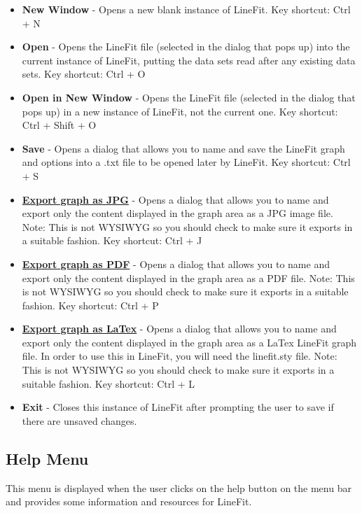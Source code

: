 \documentclass[titlepage,12pt]{article}
\begin{document}
\begin{itemize}
\item \textbf{New Window} - Opens a new blank instance of LineFit. Key shortcut: Ctrl + N
\item \textbf{Open} - Opens the LineFit file (selected in the dialog that pops up) into the current instance of LineFit, putting the data sets read after any existing data sets. Key shortcut: Ctrl + O
\item \textbf{Open in New Window} - Opens the LineFit file (selected in the dialog that pops up) in a new instance of LineFit, not the current one. Key shortcut: Ctrl + Shift + O
\item \textbf{Save} - Opens a dialog that allows you to name and save the LineFit graph and options into a .txt file to be opened later by LineFit. Key shortcut: Ctrl + S
\item \hyperref[sec:exportjpg]{\textbf{Export graph as JPG}} - Opens a dialog that allows you to name and export only the content displayed in the graph area as a JPG image file. Note: This is not WYSIWYG so you should check to make sure it exports in a suitable fashion. Key shortcut: Ctrl + J
\item \hyperref[sec:exportpdf]{\textbf{Export graph as PDF}} - Opens a dialog that allows you to name and export only the content displayed in the graph area as a PDF file. Note: This is not WYSIWYG so you should check to make sure it exports in a suitable fashion. Key shortcut: Ctrl + P
\item \hyperref[sec:exportlatex]{\textbf{Export graph as LaTex}} - Opens a dialog that allows you to name and export only the content displayed in the graph area as a LaTex LineFit graph file. In order to use this in LineFit, you will need the linefit.sty file. Note: This is not WYSIWYG so you should check to make sure it exports in a suitable fashion. Key shortcut: Ctrl + L
\item \textbf{Exit} - Closes this instance of LineFit after prompting the user to save if there are unsaved changes.
\end{itemize}



\subsection{Help Menu}

This menu is displayed when the user clicks on the help button on the menu bar and provides some information and resources for LineFit.
\end{document}
